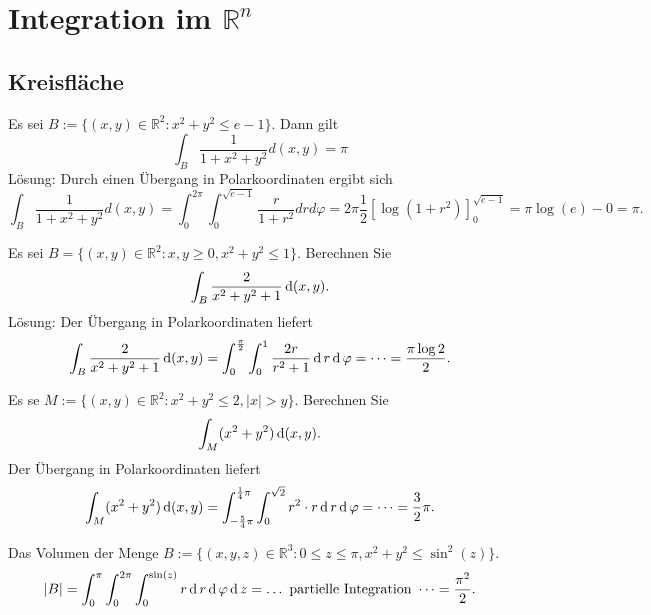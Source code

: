 \section{Integration im $\mathbb{R}^n$}
\subsection{Kreisfläche}
Es sei $B:= \{(x,y) \in \mathbb{R}^2 : x^2 + y^2 \leq e - 1\}$.
Dann gilt
\begin{displaymath}
  \int_{B} \frac{1}{1 + x^2 + y^2}d(x,y) = \pi
\end{displaymath}
Lösung:
Durch einen Übergang in Polarkoordinaten ergibt sich
\begin{displaymath}
  \int_{B} \frac{1}{1 + x^2 + y^2} d(x,y) = \int_{0}^{2\pi} \int_{0}^{\sqrt{e - 1}} \frac{r}{1 + r^2} drd\varphi = 2\pi \frac{1}{2}[\log(1 + r^2)]_{0}^{\sqrt{e-1}} = \pi \log(e) - 0 = \pi.
\end{displaymath}

Es sei $B = \{(x,y) \in \mathbb{R}^2 : x,y \geq 0, x^2 + y^2 \leq 1\}$.
Berechnen Sie
\begin{displaymath}
  \int_B \frac{2}{x^2 + y^2 + 1} \operatorname{\mathop{}\!\mathrm{d}} (x,y).
\end{displaymath}
Lösung:
Der Übergang in Polarkoordinaten liefert
\begin{displaymath}
  \int_B \frac{2}{x^2 + y^2 + 1} \operatorname{\mathop{}\!\mathrm{d}} (x,y) = \int_0^{\frac{\pi}{2}} \int_0^1 \frac{2r}{r^2 + 1} \operatorname{\mathop{}\!\mathrm{d}} r \operatorname{\mathop{}\!\mathrm{d}} \varphi = \dots = \frac{\pi \log 2}{2}.
\end{displaymath}

Es se $M := \{(x,y) \in \mathbb{R}^2 : x^2 + y^2 \leq 2, |x| > y\}$.
Berechnen Sie
\begin{displaymath}
  \int_M (x^2 + y^2) \operatorname{\mathop{}\!\mathrm{d}} (x,y).
\end{displaymath}
Der Übergang in Polarkoordinaten liefert
\begin{displaymath}
  \int_M (x^2 + y^2) \operatorname{\mathop{}\!\mathrm{d}} (x,y) = \int_{-\frac{5}{4}\pi}^{\frac{1}{4} \pi} \int_0^{\sqrt{2}} r^2 \cdot r \operatorname{\mathop{}\!\mathrm{d}} r \operatorname{\mathop{}\!\mathrm{d}} \varphi = \dots = \frac{3}{2} \pi.
\end{displaymath}

Das Volumen der Menge $B := \{(x,y,z) \in \mathbb{R}^3 : 0 \leq z \leq \pi, x^2 + y^2 \leq \sin^2(z)\}$.
\begin{displaymath}
  |B| = \int_0^{\pi} \int_0^{2\pi} \int_0^{\sin(z)} r \operatorname{\mathop{}\!\mathrm{d}} r \operatorname{\mathop{}\!\mathrm{d}} \varphi \operatorname{\mathop{}\!\mathrm{d}} z = \dots \text{ partielle Integration } \dots = \frac{\pi^2}{2}.
\end{displaymath}

